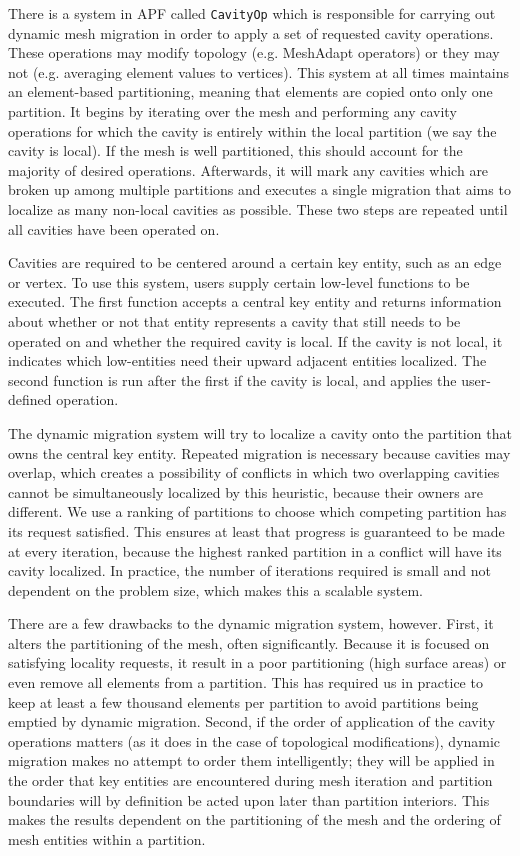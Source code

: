 There is a system in APF called \texttt{CavityOp} which is responsible
for carrying out dynamic mesh migration in order to apply a set
of requested cavity operations.
These operations may modify topology (e.g. MeshAdapt operators)
or they may not (e.g. averaging element values to vertices).
This system at all times maintains an element-based partitioning,
meaning that elements are copied onto only one partition.
It begins by iterating over the mesh and performing any
cavity operations for which the cavity is entirely within the
local partition (we say the cavity is local).
If the mesh is well partitioned, this should account for the majority
of desired operations.
Afterwards, it will mark any cavities which are broken up among
multiple partitions and executes a single migration that aims
to localize as many non-local cavities as possible.
These two steps are repeated until all cavities have been operated on.

Cavities are required to be centered around a certain key entity,
such as an edge or vertex.
To use this system, users supply certain low-level functions
to be executed.
The first function accepts a central key entity and returns information
about whether or not that entity represents a cavity that still needs
to be operated on and whether the required cavity is local.
If the cavity is not local, it indicates which low-entities need their
upward adjacent entities localized.
The second function is run after the first if the cavity is local,
and applies the user-defined operation.

The dynamic migration system will try to localize a cavity onto the
partition that owns the central key entity.
Repeated migration is necessary because cavities may overlap, which creates
a possibility of conflicts in which two overlapping cavities cannot be simultaneously
localized by this heuristic, because their owners are different.
We use a ranking of partitions to choose which competing partition
has its request satisfied.
This ensures at least that progress is guaranteed to be made at every iteration,
because the highest ranked partition in a conflict will have its cavity localized.
In practice, the number of iterations required is small and not dependent
on the problem size, which makes this a scalable system.

There are a few drawbacks to the dynamic migration system, however.
First, it alters the partitioning of the mesh, often significantly.
Because it is focused on satisfying locality requests, it result in
a poor partitioning (high surface areas) or even remove all elements
from a partition.
This has required us in practice to keep at least a few thousand
elements per partition to avoid partitions being emptied by dynamic migration.
Second, if the order of application of the cavity operations matters
(as it does in the case of topological modifications), dynamic migration
makes no attempt to order them intelligently; they will be applied
in the order that key entities are encountered during mesh iteration
and partition boundaries will by definition be acted upon later than
partition interiors.
This makes the results dependent on the partitioning of the mesh
and the ordering of mesh entities within a partition.

